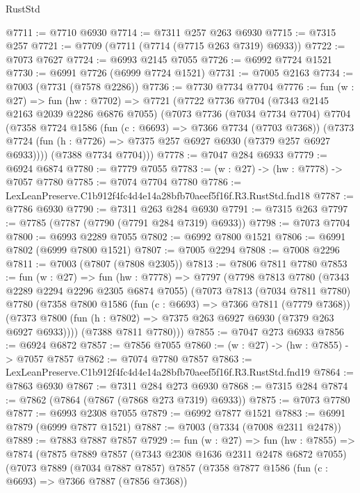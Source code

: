 \begin{lexlean}{RustStd}
\begin{coremodule}
@7711 := @7710 @6930
@7714 := @7311 @257 @263 @6930
@7715 := @7315 @257
@7721 := @7709 (@7711 (@7714 (@7715 @263 @7319) @6933))
@7722 := @7073 @7627
@7724 := @6993 @2145 @7055
@7726 := @6992 @7724 @1521
@7730 := @6991 @7726 (@6999 @7724 @1521)
@7731 := @7005 @2163
@7734 := @7003 (@7731 (@7578 @2286))
@7736 := @7730 @7734 @7704
@7776 := fun (w : @27) =>
  fun (hw : @7702) =>
  @7721
    (@7722
      @7736
      @7704
      (@7343 @2145 @2163 @2039 @2286 @6876 @7055)
      (@7073
        @7736
        (@7034 @7734 @7704)
        @7704
        (@7358
          @7724
          @1586
          (fun (c : @6693) => @7366 @7734 (@7703 @7368))
          (@7373 @7724 (fun (h : @7726) => @7375 @257 @6927 @6930 (@7379 @257 @6927 @6933))))
        (@7388 @7734 @7704)))
@7778 := @7047 @284 @6933
@7779 := @6924 @6874
@7780 := @7779 @7055
@7783 := (w : @27) -> (hw : @7778) -> @7057 @7780
@7785 := @7074 @7704 @7780
@7786 := LexLeanPreserve.C1b912f4fc4d4e14a28bfb70aeef5f16f.R3.RustStd.fnd18
@7787 := @7786 @6930
@7790 := @7311 @263 @284 @6930
@7791 := @7315 @263
@7797 := @7785 (@7787 (@7790 (@7791 @284 @7319) @6933))
@7798 := @7073 @7704
@7800 := @6993 @2289 @7055
@7802 := @6992 @7800 @1521
@7806 := @6991 @7802 (@6999 @7800 @1521)
@7807 := @7005 @2294
@7808 := @7008 @2296
@7811 := @7003 (@7807 (@7808 @2305))
@7813 := @7806 @7811 @7780
@7853 := fun (w : @27) =>
  fun (hw : @7778) =>
  @7797
    (@7798
      @7813
      @7780
      (@7343 @2289 @2294 @2296 @2305 @6874 @7055)
      (@7073
        @7813
        (@7034 @7811 @7780)
        @7780
        (@7358
          @7800
          @1586
          (fun (c : @6693) => @7366 @7811 (@7779 @7368))
          (@7373 @7800 (fun (h : @7802) => @7375 @263 @6927 @6930 (@7379 @263 @6927 @6933))))
        (@7388 @7811 @7780)))
@7855 := @7047 @273 @6933
@7856 := @6924 @6872
@7857 := @7856 @7055
@7860 := (w : @27) -> (hw : @7855) -> @7057 @7857
@7862 := @7074 @7780 @7857
@7863 := LexLeanPreserve.C1b912f4fc4d4e14a28bfb70aeef5f16f.R3.RustStd.fnd19
@7864 := @7863 @6930
@7867 := @7311 @284 @273 @6930
@7868 := @7315 @284
@7874 := @7862 (@7864 (@7867 (@7868 @273 @7319) @6933))
@7875 := @7073 @7780
@7877 := @6993 @2308 @7055
@7879 := @6992 @7877 @1521
@7883 := @6991 @7879 (@6999 @7877 @1521)
@7887 := @7003 (@7334 (@7008 @2311 @2478))
@7889 := @7883 @7887 @7857
@7929 := fun (w : @27) =>
  fun (hw : @7855) =>
  @7874
    (@7875
      @7889
      @7857
      (@7343 @2308 @1636 @2311 @2478 @6872 @7055)
      (@7073
        @7889
        (@7034 @7887 @7857)
        @7857
        (@7358
          @7877
          @1586
          (fun (c : @6693) => @7366 @7887 (@7856 @7368))

\end{coremodule}
\end{lexlean}
